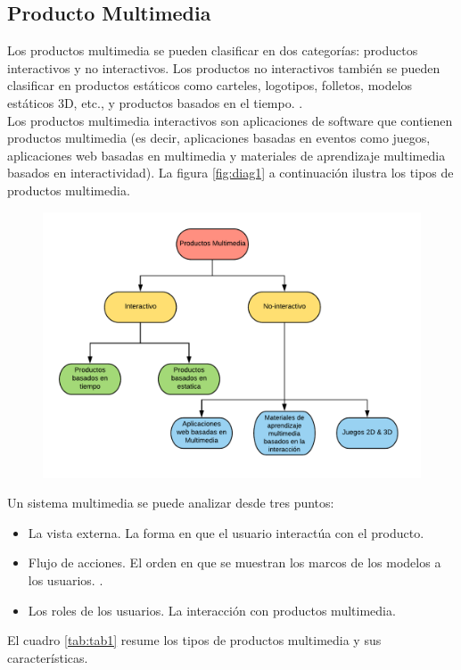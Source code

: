 \subsection{Producto Multimedia}
Los productos multimedia se pueden clasificar en dos categorías: productos interactivos y no interactivos. Los productos no interactivos también se pueden clasificar en productos estáticos como carteles, logotipos, folletos, modelos estáticos 3D, etc., y productos basados en el tiempo. \cite{engels2002object,sauer2001uml}.\\ 
\newline
Los productos multimedia interactivos son aplicaciones de software que contienen productos multimedia\cite{miranda2017diseno} (es decir, aplicaciones basadas en eventos como juegos, aplicaciones web basadas en multimedia y materiales de aprendizaje multimedia basados en interactividad).  La figura \ref{fig:diag1} a continuación ilustra los tipos de productos multimedia.\\
\begin{figure}[H]
	\begin{center}
 		\includegraphics[width = 1\textwidth]{source/images/image52.png}
	\end{center} 
\end{figure}

Un sistema multimedia se puede analizar desde tres puntos:
\begin{itemize}
\item La vista externa. La forma en que el usuario interactúa con el producto.
\item Flujo de acciones. El orden en que se muestran los marcos de los modelos a los usuarios. \cite{aleem2016game,cartwright1996pre}.
\item  Los roles de los usuarios. La interacción con productos multimedia.
\end{itemize} 
El cuadro \ref{tab:tab1} resume los tipos de productos multimedia y sus características.

